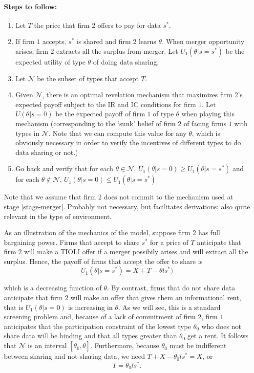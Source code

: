 \documentclass[a4paper]{article}
\newcommand{\N}{\mathcal N}
\renewcommand{\t}{\theta}
\begin{document}
\paragraph{Steps to follow:}
\begin{enumerate}[(1)]\setlength\itemsep{0em}
  \item Let $T$ the price that firm $2$ offers to pay for data $s^*$.
  \item If firm $1$ accepts, $s^*$ is shared and firm $2$ learns $\t$. When merger opportunity arises, firm $2$ extracts all the surplus from merger. Let $U_1(\t|s=s^*)$ be the expected utility of type $\t$ of doing data sharing.
  \item Let $\N$ be the subset of types that accept $T$.
  \item\label{stage-merger} Given $\N$, there is an optimal revelation mechanism that maximizes firm $2$'s expected payoff subject to the IR and IC conditions for firm $1$. Let $U(\t|s=0)$ be the expected payoff of firm $1$ of type $\t$ when playing this mechanism (corresponding to the `sunk' belief of firm $2$ of facing firms $1$ with types in $\N$. Note that we can compute this value for any $\t$, which is obviously necessary in order to verify the incentives of different types to do data sharing or not.)
  \item Go back and verify that for each $\t\in \N$, $U_1(\t|s=0)\geq U_1(\t|s=s^*)$ and for each $\t\notin \N$, $U_1(\t|s=0)\leq U_1(\t|s=s^*)$
\end{enumerate}
%
Note that we assume that firm $2$ does not commit to the mechanism used at stage \eqref{stage-merger}. Probably not necessary, but facilitates derivations; also quite relevant in the \cite{anton2002sale} type of environment.

As an illustration of the mechanics of the model, suppose firm $2$ has full bargaining power. Firms that accept to share $s^*$ for a price of $T$ anticipate that firm $2$ will make a TIOLI offer if a merger possibily arises and will extract all the surplus. Hence, the payoff of firms that accept the offer to share is   
%
\[
U_1(\t|s=s^*)=X+T-\t l s^*)
\]
%

which is a decreasing function of $\t$. By contrast, firms that do not share data anticipate that firm $2$ will make an offer that gives them an informational rent, that is $U_1(\t|s=0)$ is increasing in $\t$. As we will see, this is a standard screening problem and, because of a lack of commitment of firm $2$, firm $1$ anticipates that the participation constraint of the lowest type $\t_0$ who does not share data will be binding and that all types greater than $\t_0$ get a rent. It follows that $\N$ is an interval $[\theta_0,\overline \t]$. Furthermore, because $\t_0$ must be indifferent between sharing and not sharing data, we need $T+X-\t_0 l s^*=X$, or
\begin{equation}\label{eq:T}
  T=\t_0 l s^*.
\end{equation}
%
\end{document}
